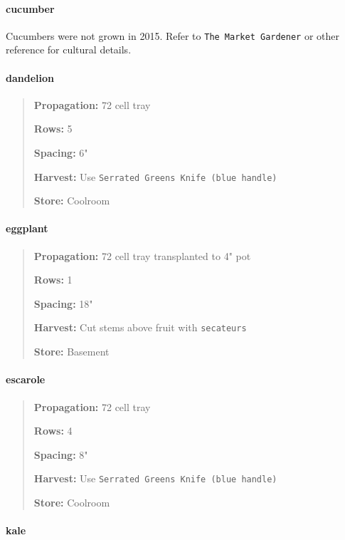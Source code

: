\paragraph{cucumber}\label{cucumber}

Cucumbers were not grown in 2015. Refer to \texttt{The Market Gardener}
or other reference for cultural details.

\paragraph{dandelion}\label{dandelion}

\begin{quote}
\textbf{Propagation:} 72 cell tray

\textbf{Rows:} 5

\textbf{Spacing:} 6"

\textbf{Harvest:} Use \texttt{Serrated Greens Knife (blue handle)}

\textbf{Store:} Coolroom
\end{quote}

\paragraph{eggplant}\label{eggplant}

\begin{quote}
\textbf{Propagation:} 72 cell tray transplanted to 4" pot

\textbf{Rows:} 1

\textbf{Spacing:} 18"

\textbf{Harvest:} Cut stems above fruit with \texttt{secateurs}

\textbf{Store:} Basement
\end{quote}

\paragraph{escarole}\label{escarole}

\begin{quote}
\textbf{Propagation:} 72 cell tray

\textbf{Rows:} 4

\textbf{Spacing:} 8"

\textbf{Harvest:} Use \texttt{Serrated Greens Knife (blue handle)}

\textbf{Store:} Coolroom
\end{quote}

\paragraph{kale}\label{kale}

